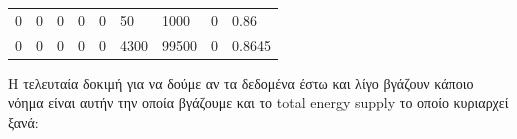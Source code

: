 \documentclass[a4paper,twoside,10pt]{article}
\begin{document}
\begin{table}[H]
\begin{tabular}{|llllllll|l|}
			0          & 0                                                          & 0         & 0                                                          & 0                                                       & 50                                                           & 1000                                                              & 0                                                             & 0.86                 \\
			0          & 0                                                          & 0         & 0                                                          & 0                                                       & 4300                                                         & 99500                                                             & 0                                                             & 0.8645               \\ \hline
		\end{tabular}
	\end{table}
	
	Η τελευταία δοκιμή για να δούμε αν τα δεδομένα έστω και λίγο βγάζουν κάποιο νόημα είναι αυτήν την οποία βγάζουμε και το total energy supply το οποίο κυριαρχεί ξανά:
	
\end{document}
